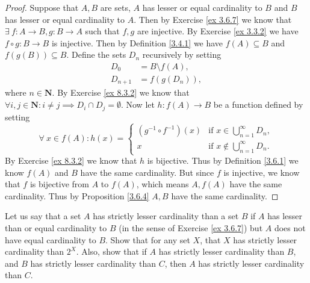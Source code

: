 \begin{proof}
    Suppose that \(A, B\) are sets, \(A\) has lesser or equal cardinality to \(B\) and \(B\) has lesser or equal cardinality to \(A\).
    Then by Exercise \ref{ex 3.6.7} we know that \(\exists\ f : A \to B, g : B \to A\) such that \(f, g\) are injective.
    By Exercise \ref{ex 3.3.2} we have \(f \circ g : B \to B\) is injective.
    Then by Definition \ref{3.4.1} we have \(f(A) \subseteq B\) and \(f(g(B)) \subseteq B\).
    Define the sets \(D_n\) recursively by setting
    \begin{align*}
        D_0       & = B \setminus f(A), \\
        D_{n + 1} & = f(g(D_n)),
    \end{align*}
    where \(n \in \mathbf{N}\).
    By Exercise \ref{ex 8.3.2} we know that \(\forall i, j \in \mathbf{N} : i \neq j \implies D_i \cap D_j = \emptyset\).
    Now let \(h : f(A) \to B\) be a function defined by setting
    \[
        \forall\ x \in f(A) : h(x) = \begin{cases}
            (g^{-1} \circ f^{-1})(x) & \text{if } x \in \bigcup_{n = 1}^\infty D_n,    \\
            x                        & \text{if } x \notin \bigcup_{n = 1}^\infty D_n.
        \end{cases}
    \]
    By Exercise \ref{ex 8.3.2} we know that \(h\) is bijective.
    Thus by Definition \ref{3.6.1} we know \(f(A)\) and \(B\) have the same cardinality.
    But since \(f\) is injective, we know that \(f\) is bijective from \(A\) to \(f(A)\), which means \(A, f(A)\) have the same cardinality.
    Thus by Proposition \ref{3.6.4} \(A, B\) have the same cardinality.
\end{proof}

\begin{exercise}\label{ex 8.3.4}
    Let us say that a set \(A\) has strictly lesser cardinality than a set \(B\) if \(A\) has lesser than or equal cardinality to \(B\) (in the sense of Exercise \ref{ex 3.6.7}) but \(A\) does not have equal cardinality to \(B\).
    Show that for any set \(X\), that \(X\) has strictly lesser cardinality than \(2^X\).
    Also, show that if \(A\) has strictly lesser cardinality than \(B\), and \(B\) has strictly lesser cardinality than \(C\), then \(A\) has strictly lesser cardinality than \(C\).
\end{exercise}

